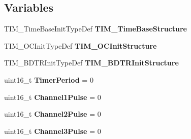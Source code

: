 \subsection*{Variables}
\begin{DoxyCompactItemize}
\item 
\hypertarget{group___t_i_m___complementary_signals_gad2b9d014ac15d04c276608d776531753}{T\-I\-M\-\_\-\-Time\-Base\-Init\-Type\-Def {\bfseries T\-I\-M\-\_\-\-Time\-Base\-Structure}}\label{group___t_i_m___complementary_signals_gad2b9d014ac15d04c276608d776531753}

\item 
\hypertarget{group___t_i_m___complementary_signals_gac4d1bcad2e781ea94976c53a092163eb}{T\-I\-M\-\_\-\-O\-C\-Init\-Type\-Def {\bfseries T\-I\-M\-\_\-\-O\-C\-Init\-Structure}}\label{group___t_i_m___complementary_signals_gac4d1bcad2e781ea94976c53a092163eb}

\item 
\hypertarget{group___t_i_m___complementary_signals_gaf74e84a2904424caf2c17849f31ebea5}{T\-I\-M\-\_\-\-B\-D\-T\-R\-Init\-Type\-Def {\bfseries T\-I\-M\-\_\-\-B\-D\-T\-R\-Init\-Structure}}\label{group___t_i_m___complementary_signals_gaf74e84a2904424caf2c17849f31ebea5}

\item 
\hypertarget{group___t_i_m___complementary_signals_ga5c7488ada09e97fa115b652002ffd360}{uint16\-\_\-t {\bfseries Timer\-Period} = 0}\label{group___t_i_m___complementary_signals_ga5c7488ada09e97fa115b652002ffd360}

\item 
\hypertarget{group___t_i_m___complementary_signals_gad6e9fbc5784e44f8d72962d827ca0b2b}{uint16\-\_\-t {\bfseries Channel1\-Pulse} = 0}\label{group___t_i_m___complementary_signals_gad6e9fbc5784e44f8d72962d827ca0b2b}

\item 
\hypertarget{group___t_i_m___complementary_signals_ga263ca5976951addacf1dc9b8930aacce}{uint16\-\_\-t {\bfseries Channel2\-Pulse} = 0}\label{group___t_i_m___complementary_signals_ga263ca5976951addacf1dc9b8930aacce}

\item 
\hypertarget{group___t_i_m___complementary_signals_gaf21e632f47ce48b86668eba1b112070f}{uint16\-\_\-t {\bfseries Channel3\-Pulse} = 0}\label{group___t_i_m___complementary_signals_gaf21e632f47ce48b86668eba1b112070f}

\end{DoxyCompactItemize}


